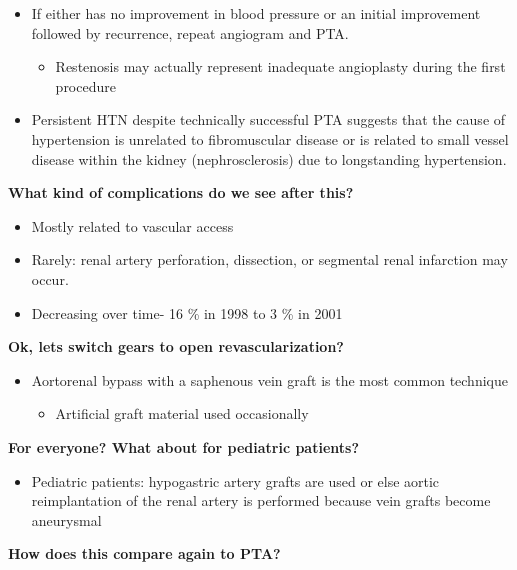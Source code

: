 \documentclass[
]{book}
\providecommand{\tightlist}{%
  \setlength{\itemsep}{0pt}\setlength{\parskip}{0pt}}
\begin{document}
\begin{itemize}
\item
  If either has no improvement in blood pressure or an initial
  improvement followed by recurrence, repeat angiogram and PTA.

  \begin{itemize}
  \tightlist
  \item
    Restenosis may actually represent inadequate angioplasty during
    the first procedure
  \end{itemize}
\item
  Persistent HTN despite technically successful PTA suggests that the
  cause of hypertension is unrelated to fibromuscular disease or is
  related to small vessel disease within the kidney (nephrosclerosis)
  due to longstanding hypertension.
\end{itemize}

\textbf{What kind of complications do we see after this?}

\begin{itemize}
\item
  Mostly related to vascular access
\item
  Rarely: renal artery perforation, dissection, or segmental renal
  infarction may occur.
\item
  Decreasing over time- 16 \% in 1998 to 3 \% in 2001
\end{itemize}

\textbf{Ok, lets switch gears to open revascularization?}

\begin{itemize}
\item
  Aortorenal bypass with a saphenous vein graft is the most common
  technique

  \begin{itemize}
  \tightlist
  \item
    Artificial graft material used occasionally
  \end{itemize}
\end{itemize}

\textbf{For everyone? What about for pediatric patients?}

\begin{itemize}
\tightlist
\item
  Pediatric patients: hypogastric artery grafts are used or else
  aortic reimplantation of the renal artery is performed because vein
  grafts become aneurysmal
\end{itemize}

\textbf{How does this compare again to PTA?}
\end{document}
